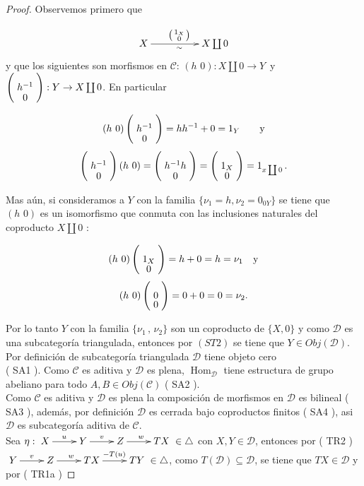 \documentclass{article}
\newcommand{\spmat}[1]{%
  \left(\begin{smallmatrix}#1\end{smallmatrix}\right)%
}
\begin{document}
\begin{enumerate}
\begin{proof}
Observemos primero que

\begin{equation*}
\xymatrix@C+2pc{X\ar[r]_{\sim}^{\spmat{1_X \\ 0}}& X\coprod 0}\\
\end{equation*}
y que los siguientes son morfismos en $\mathscr{C}$:  $(h\,\,0): X\coprod 0\rightarrow Y$\,\,\,y\,\,\, 
$\left(\xymatrix@R=-1mm{h^{-1}\\0}\right):Y\rightarrow X\coprod 0$. En particular 

\[(h\,\,0) \left(\xymatrix@R=-1mm{h^{-1}\\0}\right)=hh^{-1} +0=1_Y\qquad \text{y}\]
\[\left(\xymatrix@R=-1mm{h^{-1}\\0}\right) (h\,\,0)=\left(\xymatrix@R=-1mm{h^{-1}h\\0}\right)
=\left(\xymatrix@R=-1mm{1_X\\0}\right)=1_{x\coprod 0}\,.\]

Mas aún, si consideramos a $Y$ con la familia $\{\nu_1=h, \nu_2=0_{0Y}\}$ se tiene que $(h\,\,0)$ es un isomorfismo que conmuta con las 
inclusiones naturales del coproducto $X\coprod 0$ :

\[(h\,\,0) \left(\xymatrix@R=-1mm{1_X\\0}\right)=h+0=h=\nu_1\quad \text{y}\]
\[(h\,\,0) \left(\xymatrix@R=-1mm{0\\0}\right)=0+0=0=\nu_2.\]

Por lo tanto $Y$ con la familia $\{\nu_1\,,\,\nu_2\}$ son un coproducto de $\{X,0\}$ y como $\mathscr{D}$ es una subcategoría triangulada, entonces 
por $( ST2 )$ se tiene que $Y\in Obj(\mathscr{D})$.\\

 Por definición de subcategoría triangulada $\mathscr{D}$ tiene objeto cero \\( SA1 ). Como $\mathscr{C}$ es aditiva y $\mathscr{D}$ es 
plena, $\operatorname{Hom}_{\mathscr{D}}$ tiene estructura de grupo abeliano para todo $A,B\in Obj(\mathscr{C})$ ( SA2 ).\\

Como $\mathscr{C}$ es aditiva y $\mathscr{D}$ es plena la composición de morfismos en $\mathscr{D}$ es bilineal ( SA3 ), además, por definición
$\mathscr{D}$ es cerrada bajo coproductos finitos ( SA4 ), asi $\mathscr{D}$ es  subcategoría aditiva de $\mathscr{C}$.\\

 Sea $\eta: \xymatrix{X\ar[r]^u & Y\ar[r]^v & Z\ar[r]^w & TX } \in \triangle$ con $X,Y\in \mathscr{D}$, entonces por ( TR2 ) 
$\xymatrix{Y\ar[r]^v & Z\ar[r]^w & TX\ar[r]^{-T(u)} & TY} \in \triangle$, como $T(\mathscr{D})\subseteq \mathscr{D}$, se tiene que $TX\in 
\mathscr{D}$ y por ( TR1a ) 


\end{proof}
\end{enumerate}
\end{document}
